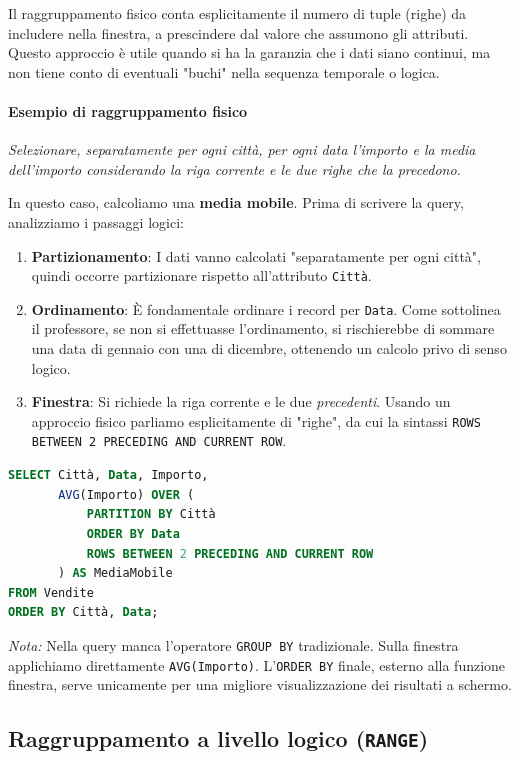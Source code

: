 Il raggruppamento fisico conta esplicitamente il numero di tuple (righe) da includere nella finestra, a prescindere dal valore che assumono gli attributi. Questo approccio è utile quando si ha la garanzia che i dati siano continui, ma non tiene conto di eventuali "buchi" nella sequenza temporale o logica.

\paragraph{Esempio di raggruppamento fisico}
\textit{Selezionare, separatamente per ogni città, per ogni data l'importo e la media dell'importo considerando la riga corrente e le due righe che la precedono.}

In questo caso, calcoliamo una \textbf{media mobile}.
Prima di scrivere la query, analizziamo i passaggi logici:
\begin{enumerate}
    \item \textbf{Partizionamento}: I dati vanno calcolati "separatamente per ogni città", quindi occorre partizionare rispetto all'attributo \texttt{Città}.
    \item \textbf{Ordinamento}: È fondamentale ordinare i record per \texttt{Data}. Come sottolinea il professore, se non si effettuasse l'ordinamento, si rischierebbe di sommare una data di gennaio con una di dicembre, ottenendo un calcolo privo di senso logico.
    \item \textbf{Finestra}: Si richiede la riga corrente e le due \textit{precedenti}. Usando un approccio fisico parliamo esplicitamente di "righe", da cui la sintassi \texttt{ROWS BETWEEN 2 PRECEDING AND CURRENT ROW}.
\end{enumerate}

\begin{lstlisting}[language=SQL, basicstyle=\small\ttfamily, keywordstyle=\bfseries\color{blue}, frame=single]
SELECT Città, Data, Importo, 
       AVG(Importo) OVER (
           PARTITION BY Città
           ORDER BY Data
           ROWS BETWEEN 2 PRECEDING AND CURRENT ROW
       ) AS MediaMobile
FROM Vendite
ORDER BY Città, Data;
\end{lstlisting}
\textit{Nota:} Nella query manca l'operatore \texttt{GROUP BY} tradizionale. Sulla finestra applichiamo direttamente \texttt{AVG(Importo)}. L'\texttt{ORDER BY} finale, esterno alla funzione finestra, serve unicamente per una migliore visualizzazione dei risultati a schermo.

\subsection{Raggruppamento a livello logico (\texttt{RANGE})}

